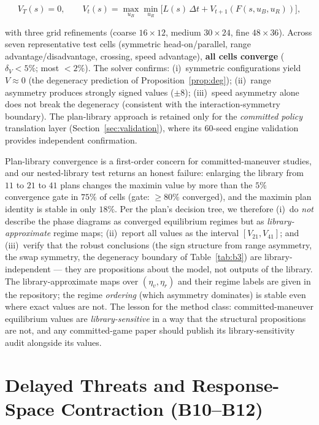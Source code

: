 \documentclass[12pt,a4paper]{article}
\newcommand{\etav}{\eta_v}
\newcommand{\etar}{\eta_r}
\begin{document}
\begin{equation}
V_T(s) = 0, \qquad
V_t(s) = \max_{u_B} \min_{u_R}
\bigl[L(s)\,\Delta t + V_{t+1}(F(s,u_B,u_R))\bigr],
\end{equation}

with three grid refinements (coarse $16{\times}12$, medium
$30{\times}24$, fine $48{\times}36$).  Across seven representative test
cells (symmetric head-on/parallel, range advantage/disadvantage,
crossing, speed advantage), \textbf{all cells converge} ($\delta_V < 5\%$;
most $< 2\%$).  The solver confirms:
(i)~symmetric configurations yield $V \approx 0$ (the degeneracy
prediction of Proposition~\ref{prop:deg});
(ii)~range asymmetry produces strongly signed values ($\pm 8$);
(iii)~speed asymmetry alone does not break the degeneracy (consistent
with the interaction-symmetry boundary).
The plan-library approach is retained only for the \emph{committed
policy} translation layer (Section~\ref{sec:validation}), where its
$60$-seed engine validation provides independent confirmation.

Plan-library convergence is a first-order concern for committed-maneuver
studies, and our nested-library test returns an honest failure: enlarging
the library from $11$ to $21$ to $41$ plans changes the maximin value by
more than the $5\%$ convergence gate in $75\%$ of cells (gate: $\ge80\%$
converged), and the maximin plan identity is stable in only $18\%$.
Per the plan's decision tree, we therefore (i)~do \emph{not} describe the
phase diagrams as converged equilibrium regimes but as
\emph{library-approximate} regime maps; (ii)~report all values as the
interval $[V_{21},V_{41}]$; and (iii)~verify that the robust conclusions
(the sign structure from range asymmetry, the swap symmetry, the
degeneracy boundary of Table~\ref{tab:b3}) are library-independent ---
they are propositions about the model, not outputs of the library.  The
library-approximate maps over $(\etav,\etar)$ and their regime labels are
given in the repository; the regime \emph{ordering} (which asymmetry
dominates) is stable even where exact values are not.  The lesson for the
method class: committed-maneuver equilibrium values are
\emph{library-sensitive} in a way that the structural propositions are
not, and any committed-game paper should publish its library-sensitivity
audit alongside its values.

\section{Delayed Threats and Response-Space Contraction (B10--B12)}
\label{sec:threat}
\end{document}
